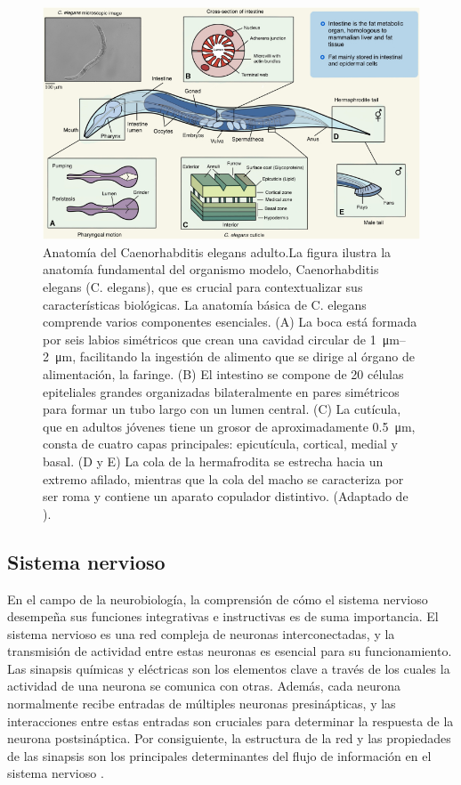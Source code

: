  \begin{figure}[h!]
	\centering\includegraphics[width=\imsize]{gr1.jpg}
	\caption[ Anatomía del Caenorhabditis elegans adulto.]{ Anatomía del Caenorhabditis elegans adulto.La figura ilustra la anatomía fundamental del organismo modelo, Caenorhabditis elegans (C. elegans), que es crucial para contextualizar sus características biológicas. La anatomía básica de C. elegans comprende varios componentes esenciales. (A) La boca está formada por seis labios simétricos que crean una cavidad circular de \qtyrange{1}{2}{\micro\metre}, facilitando la ingestión de alimento que se dirige al órgano de alimentación, la faringe. (B) El intestino se compone de 20 células epiteliales grandes organizadas bilateralmente en pares simétricos para formar un tubo largo con un lumen central. (C) La cutícula, que en adultos jóvenes tiene un grosor de aproximadamente \qty{0.5}{\micro\metre}, consta de cuatro capas principales: epicutícula, cortical, medial y basal. (D y E) La cola de la hermafrodita se estrecha hacia un extremo afilado, mientras que la cola del macho se caracteriza por ser roma y contiene un aparato copulador distintivo.  (Adaptado de \protect\cite{yue_caenorhabditis_2021} ).}\label{fig:sistema_anatomia}
\end{figure}



\subsection{Sistema nervioso}





En el campo de la neurobiología, la comprensión de cómo el sistema nervioso desempeña sus funciones integrativas e instructivas es de suma importancia. El sistema nervioso es una red compleja de neuronas interconectadas, y la transmisión de actividad entre estas neuronas es esencial para su funcionamiento. Las sinapsis químicas y eléctricas son los elementos clave a través de los cuales la actividad de una neurona se comunica con otras. Además, cada neurona normalmente recibe entradas de múltiples neuronas presinápticas, y las interacciones entre estas entradas son cruciales para determinar la respuesta de la neurona postsináptica. Por consiguiente, la estructura de la red y las propiedades de las sinapsis son los principales determinantes del flujo de información en el sistema nervioso \cite{toyoshima_deducing_2022}.

